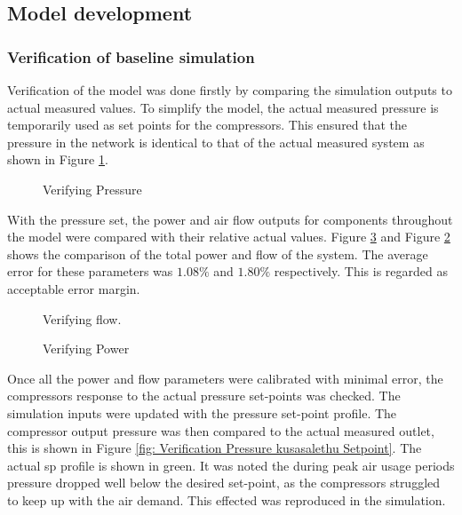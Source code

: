 	\subsection{Model development}
			
	
	\subsubsection{Verification of baseline simulation}
	Verification of the model was done firstly by comparing the simulation outputs to actual measured values. To simplify the model, the actual measured pressure is temporarily used as set points for the compressors. This ensured that the pressure in the network is identical to that of the actual measured system as shown in Figure \ref{fig: Verification Pressure kusasalethu}.
	\par 
	
	\begin{figure}[h]
		\centering
		\fbox{}
		\caption{Verifying Pressure}
		\label{fig: Verification Pressure kusasalethu}
	\end{figure}

 	With the pressure set, the power and air flow outputs for components throughout the model were compared with their relative actual values. Figure \ref{fig: Verification Power kusasalethu} and Figure \ref{fig: Verification flow kusasalethu} shows the comparison of the total power and flow of the system. The average error for these parameters was $1.08 \%$ and $1.80 \%$ respectively. This is regarded as acceptable error margin. 
 
	\begin{figure}[h]
		\centering
		\fbox{}
		\caption{Verifying flow.}
		\label{fig: Verification flow kusasalethu}
	\end{figure}
	\begin{figure}[h]
		\centering
		\fbox{}
		\caption{Verifying Power}
		\label{fig: Verification Power kusasalethu}
	\end{figure}
	Once all the power and flow parameters were calibrated with minimal error, the compressors response to the actual pressure set-points was checked. The simulation inputs were updated with the pressure set-point profile. The compressor output pressure was then compared to the actual measured outlet, this is shown in Figure \ref{fig: Verification Pressure kusasalethu Setpoint}. The actual \gls{sp} profile is shown in green. It was noted the during peak air usage periods pressure dropped well below the desired set-point, as the compressors struggled to keep up with the air demand. This effected was reproduced in the simulation.
	
